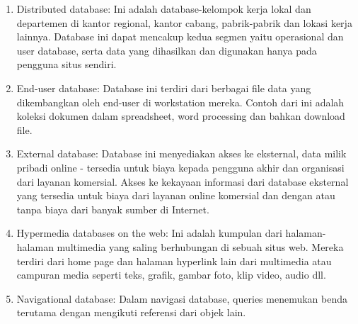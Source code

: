 \begin{enumerate}
\itemize Operational database: Database ini menyimpan data rinci yang diperlukan untuk mendukung operasi dari seluruh organisasi. Mereka juga disebut subject-area databases (SADB), transaksi database, dan produksi database. Contoh: database pelanggan, database pribadi, database inventaris, akuntansi database.
\noindent 
\itemize Analytical database: Database ini menyimpan data dan informasi yang diambil dari operasional yang dipilih dan eksternal database. Mereka terdiri dari data dan informasi yang dirangkum paling dibutuhkan oleh sebuah organisasi manajemen dan End-user lainnya. Beberapa orang menyebut analitis multidimensi database sebagai database, manajemen database, atau informasi database. \par
\noindent 
\itemize Data warehouse: Sebuah data warehouse menyimpan data dari saat ini dan tahun- tahun sebelumnya - data yang diambil dari berbagai database operasional dari sebuah organisasi.
\noindent 
\item Distributed database: Ini adalah database-kelompok kerja lokal dan departemen di kantor regional, kantor cabang, pabrik-pabrik dan lokasi kerja lainnya. Database ini dapat mencakup kedua segmen yaitu operasional dan user database, serta data yang dihasilkan dan digunakan hanya pada pengguna situs sendiri. 
\noindent 
\item End-user database: Database ini terdiri dari berbagai file data yang dikembangkan oleh end-user di workstation mereka. Contoh dari ini adalah koleksi dokumen dalam spreadsheet, word processing dan bahkan download file. 
\noindent 
\item External database: Database ini menyediakan akses ke eksternal, data milik pribadi online - tersedia untuk biaya kepada pengguna akhir dan organisasi dari layanan komersial. Akses ke kekayaan informasi dari database eksternal yang tersedia untuk biaya dari layanan online komersial dan dengan atau tanpa biaya dari banyak sumber di Internet.
\noindent 
\item Hypermedia databases on the web: Ini adalah kumpulan dari halaman-halaman multimedia yang saling berhubungan di sebuah situs web. Mereka terdiri dari home page dan halaman hyperlink lain dari multimedia atau campuran media seperti teks, grafik, gambar foto, klip video, audio dll. 
\noindent 
\item Navigational database: Dalam navigasi database, queries menemukan benda terutama dengan mengikuti referensi dari objek lain. \par

\end{enumerate}
